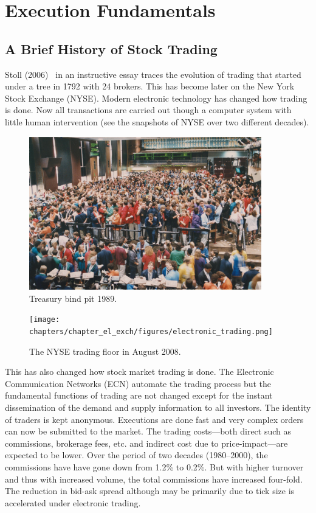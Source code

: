
\chapter{Execution Fundamentals}

\section{A Brief History of Stock Trading}
Stoll (2006)~\cite{hstoll} in an instructive essay traces the evolution of trading that started under a tree in 1792 with 24 brokers. This has become later on the New York Stock Exchange (NYSE). Modern electronic technology has changed how trading is done. Now all transactions are carried out though a computer system with little human intervention (see the snapshots of NYSE over two different decades).
	\begin{figure}[!ht]
   	\centering
   	\includegraphics[width=0.9\textwidth]{chapters/chapter_el_exch/figures/pit_trading.png} 
   	\caption{Treasury bind pit 1989. \label{fig:pittrade}}
	\end{figure}
	\begin{figure}[!ht]
	   \centering
	   \texttt{[image: chapters/chapter\_el\_exch/figures/electronic\_trading.png]} 
	   \caption{The NYSE trading floor in August 2008. \label{fig:electrade}}
	\end{figure}
This has also changed how stock market trading is done. The Electronic Communication Networks (ECN) automate the trading process but the fundamental functions of trading are not changed except for the instant dissemination of the demand and supply information to all investors. The identity of traders is kept anonymous. Executions are done fast and very complex orders can now be submitted to the market. The trading costs---both direct such as commissions, brokerage fees, etc. and indirect cost due to price-impact---are expected to be lower. Over the period of two decades (1980--2000), the commissions have have gone down from 1.2\% to 0.2\%. But with higher turnover and thus with increased volume, the total commissions have increased four-fold. The reduction in bid-ask spread although may be primarily due to tick size is accelerated under electronic trading. 


